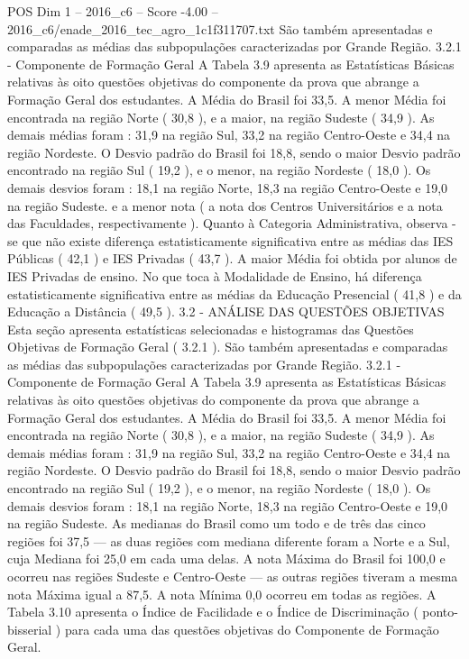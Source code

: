 \begin{textsample}{POS Dim 1 – 2016\_c6 – Score -4.00 – 2016\_c6/enade\_2016\_tec\_agro\_1c1f311707.txt}
São também apresentadas e comparadas as médias das subpopulações caracterizadas por Grande Região. 3.2.1 - Componente de Formação Geral A Tabela 3.9 apresenta as Estatísticas Básicas relativas às oito questões objetivas do componente da prova que abrange a Formação Geral dos estudantes.
A Média do Brasil foi 33,5.
A menor Média foi encontrada na região Norte ( 30,8 ), e a maior, na região Sudeste ( 34,9 ).
As demais médias foram : 31,9 na região Sul, 33,2 na região Centro-Oeste e 34,4 na região Nordeste.
O Desvio padrão do Brasil foi 18,8, sendo o maior Desvio padrão encontrado na região Sul ( 19,2 ), e o menor, na região Nordeste ( 18,0 ).
Os demais desvios foram : 18,1 na região Norte, 18,3 na região Centro-Oeste e 19,0 na região Sudeste. e a menor nota ( a nota dos Centros Universitários e a nota das Faculdades, respectivamente ).
Quanto à Categoria Administrativa, observa -se que não existe diferença estatisticamente significativa entre as médias das IES Públicas ( 42,1 ) e IES Privadas ( 43,7 ).
A maior Média foi obtida por alunos de IES Privadas de ensino.
No que toca à Modalidade de Ensino, há diferença estatisticamente significativa entre as médias da Educação Presencial ( 41,8 ) e da Educação a Distância ( 49,5 ). 3.2 - ANÁLISE DAS QUESTÕES OBJETIVAS Esta seção apresenta estatísticas selecionadas e histogramas das Questões Objetivas de Formação Geral ( 3.2.1 ).
São também apresentadas e comparadas as médias das subpopulações caracterizadas por Grande Região. 3.2.1 - Componente de Formação Geral A Tabela 3.9 apresenta as Estatísticas Básicas relativas às oito questões objetivas do componente da prova que abrange a Formação Geral dos estudantes.
A Média do Brasil foi 33,5.
A menor Média foi encontrada na região Norte ( 30,8 ), e a maior, na região Sudeste ( 34,9 ).
As demais médias foram : 31,9 na região Sul, 33,2 na região Centro-Oeste e 34,4 na região Nordeste.
O Desvio padrão do Brasil foi 18,8, sendo o maior Desvio padrão encontrado na região Sul ( 19,2 ), e o menor, na região Nordeste ( 18,0 ).
Os demais desvios foram : 18,1 na região Norte, 18,3 na região Centro-Oeste e 19,0 na região Sudeste.
As medianas do Brasil como um todo e de três das cinco regiões foi 37,5 — as duas regiões com mediana diferente foram a Norte e a Sul, cuja Mediana foi 25,0 em cada uma delas.
A nota Máxima do Brasil foi 100,0 e ocorreu nas regiões Sudeste e Centro-Oeste — as outras regiões tiveram a mesma nota Máxima igual a 87,5.
A nota Mínima 0,0 ocorreu em todas as regiões.
A Tabela 3.10 apresenta o Índice de Facilidade e o Índice de Discriminação ( ponto-bisserial ) para cada uma das questões objetivas do Componente de Formação Geral.

\end{textsample}
